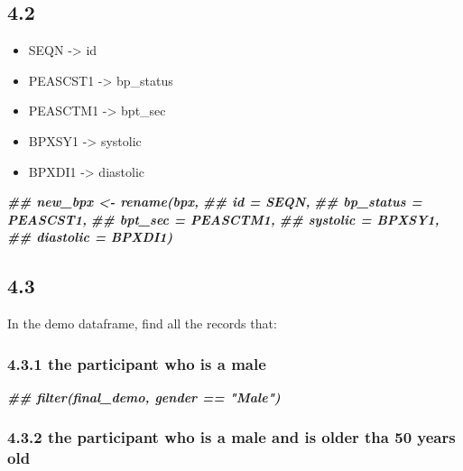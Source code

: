 \documentclass[
]{book}
\newenvironment{Shaded}{\begin{snugshade}}{\end{snugshade}}
\newcommand{\DocumentationTok}[1]{\textcolor[rgb]{0.56,0.35,0.01}{\textbf{\textit{#1}}}}
\providecommand{\tightlist}{%
  \setlength{\itemsep}{0pt}\setlength{\parskip}{0pt}}
\begin{document}
\hypertarget{section-18}{%
\subsection{4.2}\label{section-18}}

\begin{itemize}
\tightlist
\item
  SEQN -\textgreater{} id
\item
  PEASCST1 -\textgreater{} bp\_status
\item
  PEASCTM1 -\textgreater{} bpt\_sec
\item
  BPXSY1 -\textgreater{} systolic
\item
  BPXDI1 -\textgreater{} diastolic
\end{itemize}

\begin{Shaded}
\begin{Highlighting}[]
\DocumentationTok{\#\# new\_bpx \textless{}{-} rename(bpx,}
\DocumentationTok{\#\#                    id = SEQN,}
\DocumentationTok{\#\#                    bp\_status = PEASCST1,}
\DocumentationTok{\#\#                    bpt\_sec = PEASCTM1,}
\DocumentationTok{\#\#                    systolic = BPXSY1,}
\DocumentationTok{\#\#                    diastolic = BPXDI1)}
\end{Highlighting}
\end{Shaded}

\hypertarget{section-19}{%
\subsection{4.3}\label{section-19}}

In the demo dataframe, find all the records that:

\hypertarget{the-participant-who-is-a-male}{%
\subsubsection{4.3.1 the participant who is a male}\label{the-participant-who-is-a-male}}

\begin{Shaded}
\begin{Highlighting}[]
\DocumentationTok{\#\# filter(final\_demo, gender == "Male")}
\end{Highlighting}
\end{Shaded}

\hypertarget{the-participant-who-is-a-male-and-is-older-tha-50-years-old}{%
\subsubsection{4.3.2 the participant who is a male and is older tha 50 years old}\label{the-participant-who-is-a-male-and-is-older-tha-50-years-old}}
\end{document}
